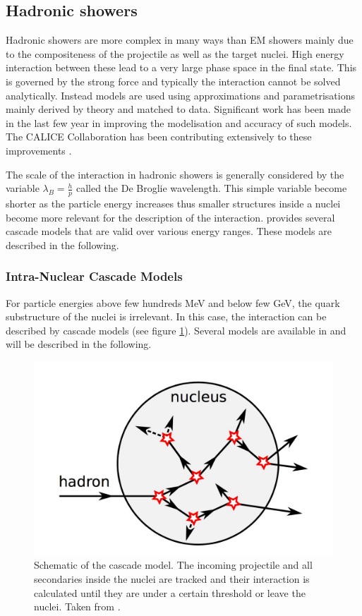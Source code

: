 \subsection{Hadronic showers}

Hadronic showers are more complex in many ways than EM showers mainly due to the compositeness of the projectile as well as the target nuclei. High energy interaction between these lead to a very large phase space in the final state. This is governed by the strong force and typically the interaction cannot be solved analytically. Instead models are used using approximations and parametrisations mainly derived by theory and matched to data. Significant work has been made in the last few year in improving the modelisation and accuracy of such models. The CALICE Collaboration has been contributing extensively to these improvements \cite{Adloff2013, Bilki2015}.

The scale of the interaction in hadronic showers is generally considered by the variable $\lambda_{B} = \frac{h}{p}$ called the De Broglie wavelength. This simple variable become shorter as the particle energy increases thus smaller structures inside a nuclei become more relevant for the description of the interaction. \geant provides several cascade models that are valid over various energy ranges. These models are described in the following.

\subsubsection{Intra-Nuclear Cascade Models}

For particle energies above few hundreds MeV and below few GeV, the quark substructure of the nuclei is irrelevant. In this case, the interaction can be described by cascade models (see figure \ref{fig:cascademodel}). Several models are available in \geant and will be described in the following.\\

\begin{figure}[t]
  \centering
  \includegraphics[width=0.5\linewidth]{chap4/fig/CascadeModel.jpeg}
  \caption{Schematic of the cascade model. The incoming projectile and all secondaries inside the nuclei are tracked and their interaction is calculated until they are under a certain threshold or leave the nuclei. Taken from \cite{Feege2011}.} \label{fig:cascademodel}
\end{figure}

